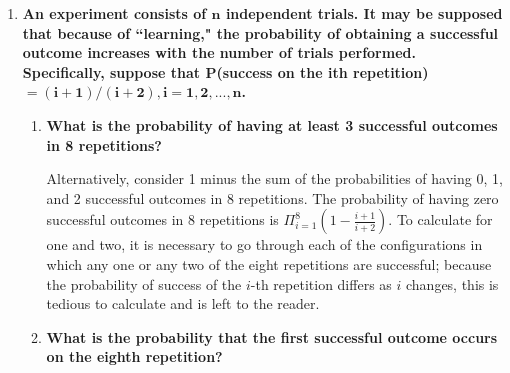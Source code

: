 \documentclass[10pt, oneside]{article}
\begin{document}
\begin{enumerate}[label=4.\arabic*]
\begin{enumerate}
	Since each tube's lifespan is independent of one another, if $A$ is the event that a tube lasts longer than 150 hours, then we need only calculate the floor value of $n$, or $\floor{n}$ such that $P(A)^n = 0.5$. Thus we calculate $P(A) = \int^{+\infty}_{150} \frac{100}{x^2} dx = 2/3$. Then
	
	\begin{align*}
	P(A)^n &= (2/3)^n = 0.5 \\
	\implies n \ln (2/3) &= \ln (0.5) \\
	\implies n &= \frac{\ln (0.5)}{ \ln(2/3)}
	\end{align*}
	
	Therefore, $\boxed{\floor{n} = 1}$.
	
	\end{enumerate}

\item  \begin{tcolorbox}[
  colback=Cerulean!5!white,
  colframe=Cerulean!75!black]
\textbf{An experiment consists of $\bm{n}$ independent trials. It may be supposed that because of ``learning," the probability of obtaining a successful outcome increases with the number of trials performed. Specifically, suppose that $\bm{P}$(success on the ith repetition) $\bm{= (i+1)/(i+2), i = 1,2,...,n}$.}
\end{tcolorbox}

	\begin{enumerate}
	\item  \begin{tcolorbox}[
	  colback=Cerulean!5!white,
	  colframe=Cerulean!75!black]
	\textbf{What is the probability of having at least 3 successful outcomes in 8 repetitions?}
	\end{tcolorbox}
	
	Alternatively, consider 1 minus the sum of the probabilities of having 0, 1, and 2 successful outcomes in 8 repetitions. The probability of having zero successful outcomes in 8 repetitions is $\Pi_{i=1}^8 (1 - \frac{i+1}{i+2})$. To calculate for one and two, it is necessary to go through each of the configurations in which any one or any two of the eight repetitions are successful; because the probability of success of the $i$-th repetition differs as $i$ changes, this is tedious to calculate and is left to the reader.
	
	\item  \begin{tcolorbox}[
	  colback=Cerulean!5!white,
	  colframe=Cerulean!75!black]
	\textbf{What is the probability that the first successful outcome occurs on the eighth repetition?}
	\end{tcolorbox}
	

\end{enumerate}
\end{enumerate}
\end{document}
